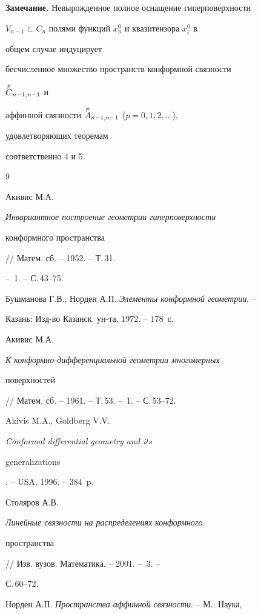 {\bf Замечание.} Невырожденное полное оснащение гиперповерхности 


$V_{n-1}\subset C_n$ полями функций $x^0_n$ и квазитензора $x^0_i$ в 


общем случае индуцирует 


бесчисленное множество пространств конформной связности 


$\overset{p}{C}{}_{n-1,n-1}$ и 


аффинной связности $\overset{p}{A}{}_{n-1,n-1}$ ($p=0,1,2,\dotsc$), 


удовлетворяющих теоремам 


соответственно 4 и 5. 


 


 


\begin{thebibliography}{9} 


 




Акивис М.А. {\em Инвариантное построение геометрии гиперповерхности 


конформного пространства} // Матем. сб. -- 1952. -- Т.\,31. 


-- \No\,1. -- С.\,43--75. 




Бушманова Г.В., Норден А.П. {\em Элементы конформной геометрии}. -- 


Казань: Изд-во Казанск. ун-та, 1972. -- 178~с. 




Акивис М.А. {\em К конформно-дифференциальной геометрии многомерных 


поверхностей} // Матем. сб. -- 1961. -- Т.\,53. -- \No\,1. -- С.\,53--72. 




Akivis M.A., Goldberg V.V. {\em Conformal differential geometry and its 


generalizations}. -- USA, 1996. -- 384~p. 




Столяров А.В. {\em Линейные связности на распределениях конформного 


пространства} // Изв. вузов. Математика. -- 2001. -- \No\,3. -- 


С.\,60--72. 




Норден А.П. {\em Пространства аффинной связности}. -- М.: Наука, 



\end{thebibliography}
